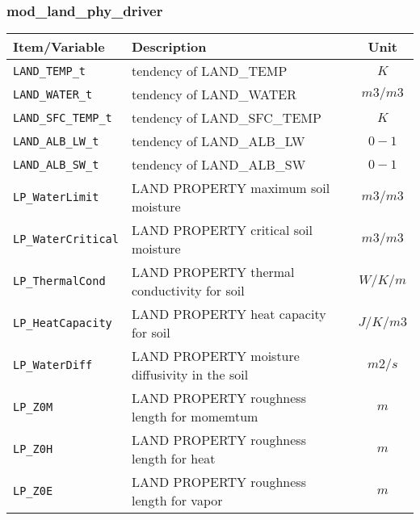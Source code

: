 \subsubsection{mod\_land\_phy\_driver}
 \begin{tabularx}{150mm}{|l|X|c|} \hline
 \rowcolor[gray]{0.9} Item/Variable & Description  & Unit \\\hline
  \verb|LAND_TEMP_t|      & tendency of LAND\_TEMP     & $K$ \\\hline
  \verb|LAND_WATER_t|     & tendency of LAND\_WATER    & $m3/m3$ \\\hline
  \verb|LAND_SFC_TEMP_t|  & tendency of LAND\_SFC\_TEMP & $K$  \\\hline
  \verb|LAND_ALB_LW_t|    & tendency of LAND\_ALB\_LW   & $0-1$  \\\hline
  \verb|LAND_ALB_SW_t|    & tendency of LAND\_ALB\_SW   & $0-1$  \\\hline
  \verb|LP_WaterLimit|    & LAND PROPERTY  maximum  soil moisture           & $m3/m3$  \\\hline
  \verb|LP_WaterCritical| & LAND PROPERTY  critical soil moisture           & $m3/m3$  \\\hline
  \verb|LP_ThermalCond|   & LAND PROPERTY  thermal conductivity for soil    & $W/K/m$  \\\hline
  \verb|LP_HeatCapacity|  & LAND PROPERTY  heat capacity for soil           & $J/K/m3$ \\\hline
  \verb|LP_WaterDiff|     & LAND PROPERTY  moisture diffusivity in the soil & $m2/s$   \\\hline
  \verb|LP_Z0M|           & LAND PROPERTY  roughness length for momemtum    & $m$      \\\hline
  \verb|LP_Z0H|           & LAND PROPERTY  roughness length for heat        & $m$      \\\hline
  \verb|LP_Z0E|           & LAND PROPERTY  roughness length for vapor       & $m$      \\\hline
 \end{tabularx}

